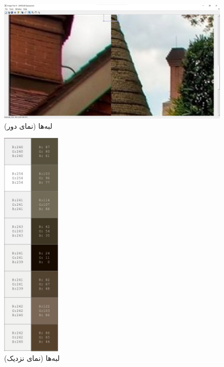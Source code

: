 \documentclass{article}
\begin{document}
\begin{figure}[H]
    \centering
    \includegraphics[width=1.0\textwidth]{figures/4p3p.jpg}
    \caption
	{
لبه‌ها (نمای دور)
	}
    \label{fig:fig1}
\end{figure}
\begin{figure}[H]
    \centering
    \includegraphics[width=0.25\textwidth]{figures/4p3.jpg}
    \caption
	{
لبه‌ها (نمای نزدیک)
	}
    \label{fig:fig1}
\end{figure}
\end{document}
